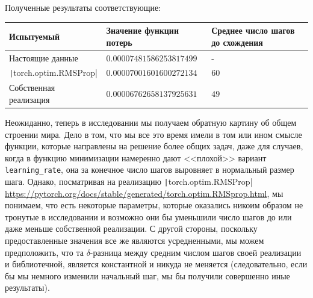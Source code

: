 \documentclass[12pt, a4paper, oneside, final]{article}
\begin{document}
	Полученные результаты соответствующие:
	\begin{table}[H]
		\centering
		\begin{tabular}{l|l|l}
			Испытуемый & Значение функции потерь & Среднее число шагов до схождения \\ \hline
			Настоящие данные & $0.00007481586253817499$ & - \\
			\texttt|torch.optim.RMSProp| & $0.00007001601600272134$ & $60$ \\
			Собственная реализация & $0.00006762658137925631$ & $49$
		\end{tabular}
	\end{table}
	Неожиданно, теперь в исследовании мы получаем обратную картину об общем строении мира.
	Дело в том, что мы все это время имели в том или ином смысле функции, которые направлены на решение более общих задач, даже для случаев, когда в функцию минимизации намеренно дают <<плохой>> вариант \texttt{learning\_rate}, она за конечное число шагов выровняет в нормальный размер шага.
	Однако, посматривая на реализацию \texttt|torch.optim.RMSProp| \url{https://pytorch.org/docs/stable/generated/torch.optim.RMSprop.html}, мы понимаем, что есть некоторые параметры, которые оказались никоим образом не тронутые в исследовании и возможно они бы уменьшили число шагов до или даже меньше собственной реализации.
	С другой стороны, поскольку предоставленные значения все же являются усредненными, мы можем предположить, что та $\delta$-разница между средним числом шагов своей реализации и библиотечной, является константной и никуда не меняется (следовательно, если бы мы немного изменили начальный шаг, мы бы получили совершенно иные результаты).
\end{document}

